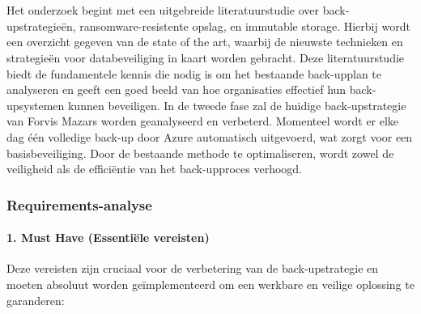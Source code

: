 
\chapter{}%
\label{ch:methodologie}


Het onderzoek begint met een uitgebreide literatuurstudie over back-upstrategieën, ransomware-resistente opslag, en immutable storage. Hierbij wordt een overzicht gegeven van de state of the art, waarbij de nieuwste technieken en strategieën voor databeveiliging in kaart worden gebracht. Deze literatuurstudie biedt de fundamentele kennis die nodig is om het bestaande back-upplan te analyseren en geeft een goed beeld van hoe organisaties effectief hun back-upsystemen kunnen beveiligen. In de tweede fase zal de huidige back-upstrategie van Forvis Mazars worden geanalyseerd en verbeterd. Momenteel wordt er elke dag één volledige back-up door Azure automatisch uitgevoerd, wat zorgt voor een basisbeveiliging. Door de bestaande methode te optimaliseren, wordt zowel de veiligheid als de efficiëntie van het back-upproces verhoogd.
\subsection{Requirements-analyse}
\subsubsection{1. Must Have (Essentiële vereisten)}
Deze vereisten zijn cruciaal voor de verbetering van de back-upstrategie en moeten absoluut worden geïmplementeerd om een werkbare en veilige oplossing te garanderen:

